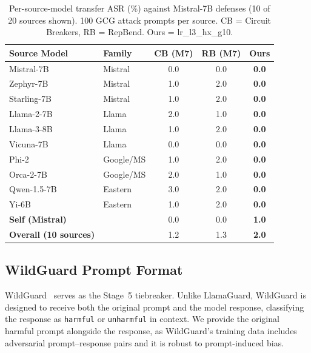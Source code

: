 \begin{table}[ht]
\centering
\caption{Per-source-model transfer ASR (\%) against Mistral-7B defenses (10 of 20 sources shown). 100 GCG attack prompts per source. CB = Circuit Breakers, RB = RepBend. Ours = lr\_l3\_hx\_g10.}
\label{tab:baselines_expanded}
\setlength{\tabcolsep}{8pt}
\renewcommand{\arraystretch}{1.2}
\begin{tabular}{@{}llccc@{}}
\toprule
\textbf{Source Model} & \textbf{Family} & \textbf{CB (M7)} & \textbf{RB (M7)} & \textbf{Ours} \\
\midrule
Mistral-7B      & Mistral  & 0.0 & 0.0 & \textbf{0.0} \\
Zephyr-7B       & Mistral  & 1.0 & 2.0 & \textbf{0.0} \\
Starling-7B     & Mistral  & 1.0 & 2.0 & \textbf{0.0} \\
Llama-2-7B      & Llama    & 2.0 & 1.0 & \textbf{0.0} \\
Llama-3-8B      & Llama    & 1.0 & 2.0 & \textbf{0.0} \\
Vicuna-7B       & Llama    & 0.0 & 0.0 & \textbf{0.0} \\
Phi-2           & Google/MS & 1.0 & 2.0 & \textbf{0.0} \\
Orca-2-7B       & Google/MS & 2.0 & 1.0 & \textbf{0.0} \\
Qwen-1.5-7B     & Eastern  & 3.0 & 2.0 & \textbf{0.0} \\
Yi-6B           & Eastern  & 1.0 & 2.0 & \textbf{0.0} \\
\midrule
\textbf{Self (Mistral)} &  & 0.0 & 0.0 & \textbf{1.0} \\
\textbf{Overall (10 sources)} &  & 1.2 & 1.3 & \textbf{2.0} \\
\bottomrule
\end{tabular}
\setlength{\tabcolsep}{6pt}
\renewcommand{\arraystretch}{1.0}
\end{table}

\subsection{WildGuard Prompt Format}
\label{app:wildguard_prompt}

WildGuard~\citep{wildguardmix} serves as the Stage~5 tiebreaker. Unlike LlamaGuard, WildGuard is designed to receive both the original prompt and the model response, classifying the response as \texttt{harmful} or \texttt{unharmful} in context. We provide the original harmful prompt alongside the response, as WildGuard's training data includes adversarial prompt--response pairs and it is robust to prompt-induced bias.


